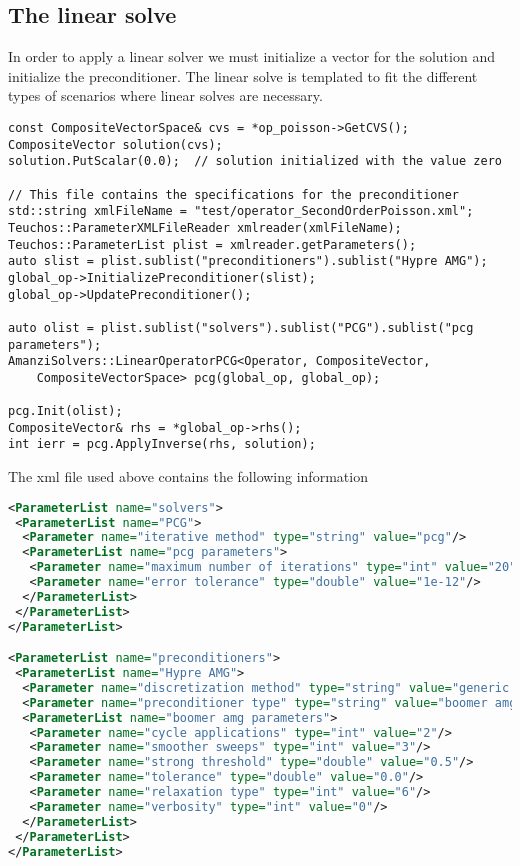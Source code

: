 \subsection{The linear solve}\label{Sec:Linear Solve}
%
In order to apply a linear solver we must initialize a vector for the solution and initialize the preconditioner.
%
The linear solve is templated to fit the different types of scenarios where linear solves are necessary.
%
\begin{lstlisting}
const CompositeVectorSpace& cvs = *op_poisson->GetCVS();
CompositeVector solution(cvs);
solution.PutScalar(0.0);  // solution initialized with the value zero

// This file contains the specifications for the preconditioner
std::string xmlFileName = "test/operator_SecondOrderPoisson.xml"; 
Teuchos::ParameterXMLFileReader xmlreader(xmlFileName);
Teuchos::ParameterList plist = xmlreader.getParameters();
auto slist = plist.sublist("preconditioners").sublist("Hypre AMG");
global_op->InitializePreconditioner(slist);
global_op->UpdatePreconditioner();

auto olist = plist.sublist("solvers").sublist("PCG").sublist("pcg parameters");
AmanziSolvers::LinearOperatorPCG<Operator, CompositeVector,
    CompositeVectorSpace> pcg(global_op, global_op);

pcg.Init(olist);
CompositeVector& rhs = *global_op->rhs();
int ierr = pcg.ApplyInverse(rhs, solution);
\end{lstlisting}
%
The xml file used above contains the following information
%
\begin{lstlisting}[language=xml]
<ParameterList name="solvers">
 <ParameterList name="PCG">
  <Parameter name="iterative method" type="string" value="pcg"/>
  <ParameterList name="pcg parameters">
   <Parameter name="maximum number of iterations" type="int" value="20"/>
   <Parameter name="error tolerance" type="double" value="1e-12"/>
  </ParameterList>
 </ParameterList>
</ParameterList>

<ParameterList name="preconditioners">
 <ParameterList name="Hypre AMG">
  <Parameter name="discretization method" type="string" value="generic mfd"/>
  <Parameter name="preconditioner type" type="string" value="boomer amg"/>
  <ParameterList name="boomer amg parameters">
   <Parameter name="cycle applications" type="int" value="2"/>
   <Parameter name="smoother sweeps" type="int" value="3"/>
   <Parameter name="strong threshold" type="double" value="0.5"/>
   <Parameter name="tolerance" type="double" value="0.0"/>
   <Parameter name="relaxation type" type="int" value="6"/>
   <Parameter name="verbosity" type="int" value="0"/>
  </ParameterList>
 </ParameterList>
</ParameterList>
\end{lstlisting}
%
